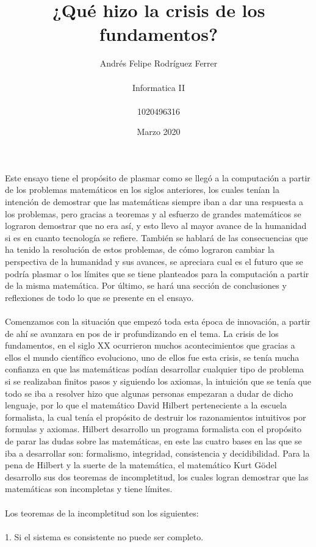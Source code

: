 \documentclass{article}
\title{¿Qué hizo la crisis de los fundamentos?}
\author{Andrés Felipe Rodríguez Ferrer\\\\Informatica II\\\\1020496316}
\date{Marzo 2020}
\begin{document}
\maketitle
Este ensayo tiene el propósito de plasmar como se llegó a la computación a partir de los problemas matemáticos en los siglos anteriores, los cuales tenían la intención de demostrar que las matemáticas siempre iban a dar una respuesta a los problemas, pero gracias a teoremas y al esfuerzo de grandes matemáticos se lograron demostrar que no era así, y esto llevo al mayor avance de la humanidad si es en cuanto tecnología se refiere. También se hablará de las consecuencias que ha tenido la resolución de estos problemas, de cómo lograron cambiar la perspectiva de la humanidad y sus avances, se apreciara cual es el futuro que se podría plasmar o los límites que se tiene planteados para la computación a partir de la misma matemática. Por último, se hará una sección de conclusiones y reflexiones de todo lo que se presente en el ensayo.\citep{1}\\\\
Comenzamos con la situación que empezó toda esta época de innovación, a partir de ahí se avanzara en pos de ir profundizando en el tema. La crisis de los fundamentos, en el siglo XX ocurrieron muchos acontecimientos que gracias a ellos el mundo científico evoluciono, uno de ellos fue esta crisis, se tenía mucha confianza en que las matemáticas podían desarrollar cualquier tipo de problema si se realizaban finitos pasos y siguiendo los axiomas, la intuición que se tenía que todo se iba a resolver hizo que algunas personas empezaran a dudar de dicho lenguaje, por lo que el matemático David Hilbert perteneciente a la escuela formalista, la cual tenía el propósito de destruir los razonamientos intuitivos por formulas y axiomas. Hilbert desarrollo un programa formalista con el propósito de parar las dudas sobre las matemáticas, en este las cuatro bases en las que se iba a desarrollar son: formalismo, integridad, consistencia y decidibilidad. Para la pena de Hilbert y la suerte de la matemática, el matemático Kurt Gödel desarrollo sus dos teoremas de incompletitud, los cuales logran demostrar que las matemáticas son incompletas y tiene límites\citep{2}.\\\\Los teoremas de la incompletitud son los siguientes:\\\\ 
1.	Si el sistema es consistente no puede ser completo.\citep{3}\\\\
\end{document}
